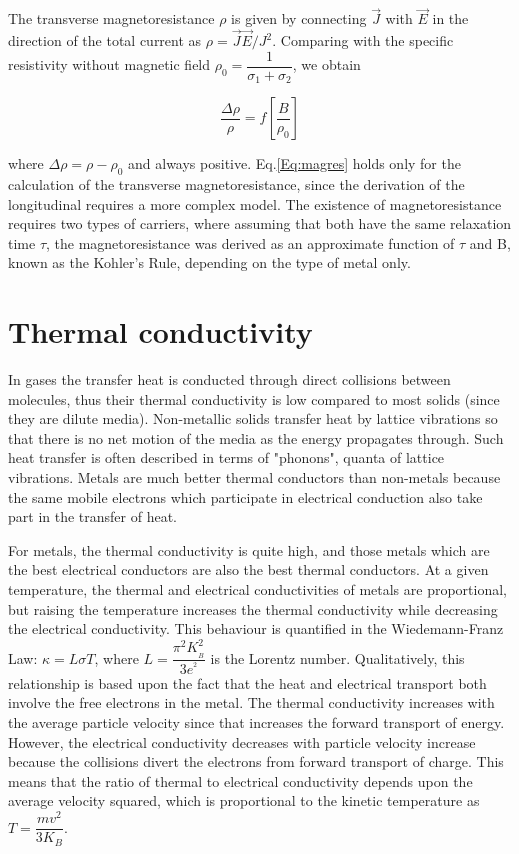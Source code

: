 \documentclass[openany,11pt,a4paper]{report}
\begin{document}
The transverse magnetoresistance $\rho$ is given by connecting $\vec{J}$ with $\vec{E}$
in the direction of the total current as $\rho= \vec{J} \vec{E}/ J^{2}$. Comparing with  the specific resistivity without magnetic field $\rho _{0}= \dfrac{1}{\sigma _{1} + \sigma _{2}}$, we obtain 

\begin{equation}
\dfrac{\Delta \rho}{\rho}  = f \left[ \dfrac{B}{\rho_{0}}\right]
\end{equation}\label{Eq:magres}

where $\Delta \rho = \rho - \rho_{0}$ and always positive. Eq.\ref{Eq:magres} holds only for the calculation of the transverse magnetoresistance, since the derivation of the longitudinal requires a more complex model. The existence of magnetoresistance requires two types of carriers, where assuming that both have the same relaxation time $\tau$, the  magnetoresistance was derived as an approximate function of $\tau$ and B, known as the Kohler's Rule, depending on the type of metal only.



\section{Thermal conductivity }


In gases the transfer heat is conducted through direct collisions between molecules, thus their thermal conductivity is low compared to most solids (since they are dilute media). Non-metallic solids transfer heat by lattice vibrations so that there is no net motion of the media as the energy propagates through. Such heat transfer is often described in terms of "phonons", quanta of lattice vibrations. Metals are much better thermal conductors than non-metals because the same mobile electrons which participate in electrical conduction also take part in the transfer of heat.


For metals, the thermal conductivity is quite high, and those metals which are the best electrical conductors are also the best thermal conductors. At a given temperature, the thermal and electrical conductivities of metals are proportional, but raising the temperature increases the thermal conductivity while decreasing the electrical conductivity. This behaviour is quantified in the Wiedemann-Franz Law: $\kappa= L \sigma T$, where $L=\dfrac{\pi^{2}K^{2}_{_{B}}}{3e^{^{2}}}$ is the Lorentz number. Qualitatively, this relationship is based upon the fact that the heat and electrical transport both involve the free electrons in the metal. The thermal conductivity increases with the average particle velocity since that increases the forward transport of energy. However, the electrical conductivity decreases with particle velocity increase because the collisions divert the electrons from forward transport of charge. This means that the ratio of thermal to electrical conductivity depends upon the average velocity squared, which is proportional to the kinetic temperature as $T=\dfrac{mv^{2}}{3 K_{B}}$.\\
\end{document}
